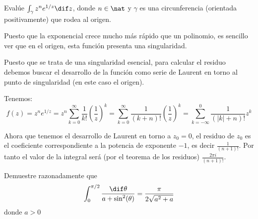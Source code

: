 \begin{problem}[5]
Evalúe $\int_{\gamma} z^n e^{1/z} \dif z$, donde $n \in \nat$ y $\gamma$ es una circunferencia (orientada positivamente) que rodea al origen.
\solution


Puesto que la exponencial crece mucho más rápido que un polinomio, es sencillo ver que en el origen, esta función presenta una singularidad.

Puesto que se trata de una singularidad esencial, para calcular el residuo debemos buscar el desarrollo de la función como serie de Laurent en torno al punto de singularidad (en este caso el origen).

Tenemos:
\[f(z)=z^ne^{1/z}=z^n\sum_{k=0}^{\infty}\frac{1}{k!}\left(\frac{1}{z}\right)^k=\sum_{k=0}^{\infty}\frac{1}{(k+n)!}\left(\frac{1}{z}\right)^k=\sum_{k=-\infty}^0\frac{1}{(|k|+n)!}z^k\]

Ahora que tenemos el desarrollo de Laurent en torno a $z_0=0$, el residuo de $z_0$ es el coeficiente correspondiente a la potencia de exponente $-1$, es decir $\frac{1}{(n+1)!}$. Por tanto el valor de la integral será (por el teorema de los residuos) $\frac{2πi}{(n+1)!}$.


\end{problem}

\begin{problem}[6]
Demuestre razonadamente que
\[\int_{0}^{\pi / 2} \frac{\dif \theta}{a + \sin^2(\theta)} = \frac{\pi}{2 \sqrt{a^2 + a}}\]
donde $a > 0$
\solution

\end{problem}

